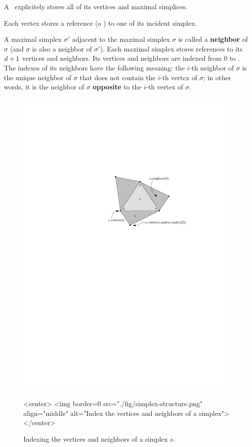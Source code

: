 {A \pcds\ explicitely stores all of its vertices and maximal simplices.

Each vertex stores a reference (a ) to one of its incident
simplex.

A maximal simplex $\sigma'$ adjacent to the maximal simplex $\sigma$ is called
a \textbf{neighbor} of $\sigma$ (and $\sigma$ is also a neighbor of
$\sigma'$). Each maximal simplex stores references to its $d+1$ vertices and
neighbors. Its vertices and neighbors are indexed from $0$ to \cd. The indexes
of its neighbors have the following meaning: the $i$-th neighbor of $\sigma$
is the unique neighbor of $\sigma$ that does not contain the $i$-th vertex of
$\sigma$; in other words, it is the neighbor of $\sigma$ \textbf{opposite} to
the $i$-th vertex of $\sigma$.

\begin{figure}[htbp]
\begin{ccTexOnly}
\begin{center}
\includegraphics{Pure_complex/fig/simplex-structure.pdf}
\end{center}
\end{ccTexOnly}
\begin{ccHtmlOnly}
<center>
<img border=0 src="./fig/simplex-structure.png" align="middle" alt="Index the vertices and neighbors of a simplex">
</center>
\end{ccHtmlOnly}
\caption{Indexing the vertices and neighbors of a simplex $s$.}
\label{pure_complex:fig:simplex}
\end{figure} 

}
